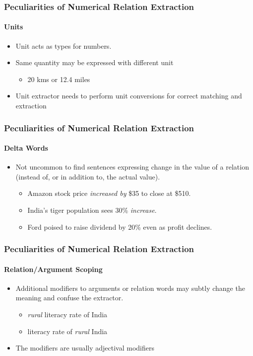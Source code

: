 \documentclass{beamer}
\begin{document}
\begin{frame}
\frametitle{Peculiarities of Numerical Relation Extraction}
\framesubtitle{Units}
\begin{itemize}
\setlength \itemsep{1em}
\item Unit acts as types for numbers.
\item Same quantity may be expressed with different unit
	\begin{itemize}
    	\item 20 kms or 12.4 miles
   	\end{itemize}
\item Unit extractor needs to perform unit conversions for correct matching and extraction
\end{itemize}
\end{frame}

\begin{frame}
\frametitle{Peculiarities of Numerical Relation Extraction}
\framesubtitle{Delta Words}

\begin{itemize}
\setlength \itemsep{1em}
\item Not uncommon to find sentences expressing change in the value of a relation (instead of, or in addition to, the actual value).
\begin{itemize}
\setlength \itemsep{1em}
\item Amazon stock price \textit{\color{red}increased by} \$35 to close at \$510.
\item India's tiger population sees 30\% \textit{\color{red}increase}.
\item Ford poised to raise dividend by 20\% even as profit declines.
\end{itemize}
\end{itemize}
\end{frame}

\begin{frame}
\frametitle{Peculiarities of Numerical Relation Extraction}
\framesubtitle{Relation/Argument Scoping}

\begin{itemize}
\setlength \itemsep{1em}
\item Additional modifiers to arguments or relation words may subtly change the meaning and confuse the extractor.
\begin{itemize}
\setlength \itemsep{1em}
\item \emph{rural} literacy rate of India
\item literacy rate of \emph{rural} India
\end{itemize}
\item The modifiers are usually adjectival modifiers
\end{itemize}

\end{frame}
\end{document}
